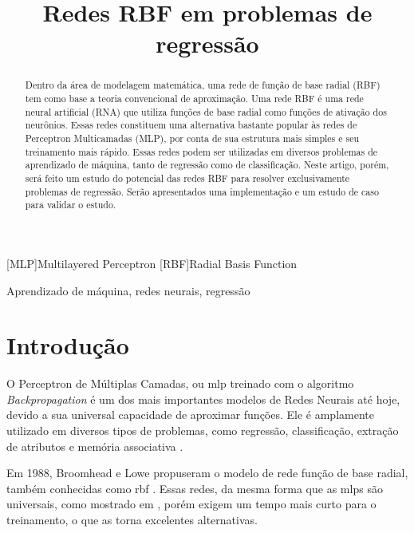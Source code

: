 \documentclass[conference]{IEEEtran}
\title{Redes RBF em problemas de regressão}
\author{\IEEEauthorblockN{Vítor de Albuquerque Torreão}
	\IEEEauthorblockA{Departamento de Estatística e Informática\\
		Universidade Federal Rural de Pernambuco\\
		Recife, Pernambuco\\
		Email: vdat@mail.com}}
\begin{document}
\maketitle

\begin{acronym}
[MLP]{Multilayered Perceptron}
[RBF]{Radial Basis Function}
\end{acronym}

\begin{abstract}
Dentro da área de modelagem matemática, uma rede de função de base radial (RBF) 
tem como base a teoria convencional de aproximação. Uma rede RBF é uma rede 
neural artificial (RNA) que utiliza funções de base radial como 
funções de ativação dos neurônios. Essas redes constituem uma alternativa 
bastante popular às redes de Perceptron Multicamadas (MLP), por conta de sua 
estrutura mais simples e seu treinamento mais rápido. Essas redes podem ser 
utilizadas em diversos problemas de aprendizado de máquina, tanto de regressão 
como de classificação. Neste artigo, porém, será feito um estudo do potencial 
das redes RBF para resolver exclusivamente problemas de regressão. Serão 
apresentados uma implementação e um estudo de caso para validar o estudo.
\end{abstract}

\begin{IEEEkeywords}
Aprendizado de máquina, redes neurais, regressão
\end{IEEEkeywords}

\section{Introdução}
\label{introducao}

O Perceptron de Múltiplas Camadas, ou \ac{mlp} treinado com o algoritmo \textit{
Backpropagation} \cite{Rumelhart:1988:LIR:65669.104449} é um dos mais 
importantes modelos de Redes Neurais até hoje, devido a sua universal capacidade 
de aproximar funções. Ele é amplamente utilizado em diversos tipos de problemas, 
como regressão, classificação, extração de atributos e memória associativa 
\cite{wu2012using}.

Em 1988, Broomhead e Lowe propuseram o modelo de rede função de base radial, 
também conhecidas como \ac{rbf} \cite{2144306}. Essas redes, da mesma forma que 
as \acp*{mlp} são universais, como mostrado em 
\cite{Park:1991:UAU:110084.110093}, porém exigem um tempo mais curto para o 
treinamento, o que as torna excelentes alternativas.
\end{document}
